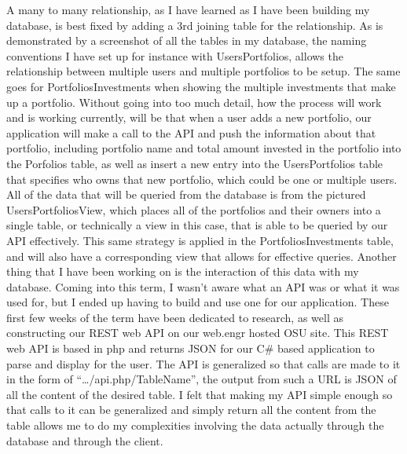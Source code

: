 \documentclass[letterpaper,10pt,titlepage,journal,compsoc,draftclsnofoot,onecolumn]{IEEEtran}
\begin{document}
A many to many relationship, as I have learned as I have been building my database, is best fixed by adding a 3rd joining table for the relationship. As is demonstrated by a screenshot of all the tables in my database, the naming conventions I have set up for instance with UsersPortfolios, allows the relationship between multiple users and multiple portfolios to be setup. The same goes for PortfoliosInvestments when showing the multiple investments that make up a portfolio. Without going into too much detail, how the process will work and is working currently, will be that when a user adds a new portfolio, our application will make a call to the API and push the information about that portfolio, including portfolio name and total amount invested in the portfolio into the Porfolios table, as well as insert a new entry into the UsersPortfolios table that specifies who owns that new portfolio, which could be one or multiple users. All of the data that will be queried from the database is from the pictured UsersPortfoliosView, which places all of the portfolios and their owners into a single table, or technically a view in this case, that is able to be queried by our API effectively. This same strategy is applied in the PortfoliosInvestments table, and will also have a corresponding view that allows for effective queries.
Another thing that I have been working on is the interaction of this data with my database. Coming into this term, I wasn’t aware what an API was or what it was used for, but I ended up having to build and use one for our application. These first few weeks of the term have been dedicated to research, as well as constructing our REST web API on our web.engr hosted OSU site. This REST web API is based in php and returns JSON for our C# based application to parse and display for the user.  The API is generalized so that calls are made to it in the form of “…/api.php/{TableName}”, the output from such a URL is JSON of all the content of the desired table. I felt that making my API simple enough so that calls to it can be generalized and simply return all the content from the table allows me to do my complexities involving the data actually through the database and through the client. 

\end{document}
